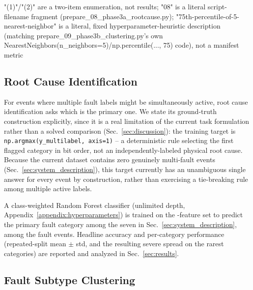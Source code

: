 "(1)"/"(2)" are a two-item enumeration, not results; "08" is a literal script-filename fragment (prepare_08_phase3a_rootcause.py); "75th-percentile-of-5-nearest-neighbor" is a literal, fixed hyperparameter-heuristic description (matching prepare_09_phase3b_clustering.py's own NearestNeighbors(n_neighbors=5)/np.percentile(..., 75) code), not a manifest metric

\subsection{Root Cause Identification}
\label{sec:rootcause}

For events where multiple fault labels might be simultaneously active, root cause identification asks which is the primary one. We state its ground-truth construction explicitly, since it is a real limitation of the current task formulation rather than a solved comparison (Sec.~\ref{sec:discussion}): the training target is \texttt{np.argmax(y\_multilabel, axis=1)} -- a deterministic rule selecting the first flagged category in bit order, not an independently-labeled physical root cause. %
Because the current dataset contains zero genuinely multi-fault events (Sec.~\ref{sec:system_description}), this target currently has an unambiguous single answer for every event by construction, rather than exercising a tie-breaking rule among multiple active labels.

A class-weighted Random Forest classifier (unlimited depth, Appendix~\ref{appendix:hyperparameters}) is trained on the \MetricZeroSixBinaryClassificationNFeatures{}-feature set to predict the primary fault category among the seven in Sec.~\ref{sec:system_description}, among the \MetricZeroEightPhaseThreeaRootcauseNFaultEvents{} fault events. Headline accuracy and per-category performance (repeated-split mean $\pm$ std, and the resulting severe spread on the rarest categories) are reported and analyzed in Sec.~\ref{sec:results}.

\subsection{Fault Subtype Clustering}

